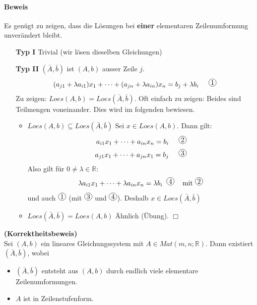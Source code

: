 \documentclass[11pt]{report}
\newcommand*\mycirc[1]{%
  \begin{tikzpicture}
    \node[draw,circle,inner sep=1pt] {#1};
  \end{tikzpicture}}
\newcommand*\Zb[1] {\mathbb{#1}}
\newcommand*\f[1] {\textbf{#1}}
\begin{document}
\paragraph{Beweis}
Es genügt zu zeigen, dass die Lösungen  bei \f{einer} elementaren Zeilenumformung unverändert bleibt.
\begin{itemize}
 \item[\f{Typ I}] Trivial (wir lösen dieselben Gleichungen)
 \item[\f{Typ II}] $(\bar{A}, \bar{b})$ ist $(A, b)$ ausser Zeile $j$.
\begin{align}
 (a_{j1} + \lambda a_{i1}) x_1 + \cdots + (a_{jn}+ \lambda a_{in}) x_n = b_j + \lambda b_i \hspace*{0.5cm} \mycirc{1}
\end{align}
Zu zeigen: $Loes(A, b) = Loes (\bar{A}, \bar{b})$. Oft einfach zu zeigen: Beides sind Teilmengen voneinander. Dies wird im folgenden bewiesen.
\begin{itemize}
\item \f{$Loes(A, b) \subseteq Loes (\bar{A}, \bar{b})$} Sei $x \in Loes(A,b)$. Dann gilt:
\begin{align}
 a_{i1} x_1 + \cdots + a_{in} x_n = b_i \hspace*{0.5cm} \mycirc{2}\\
 a_{j1} x_1 + \cdots + a_{jn} x_1 = b_j \hspace*{0.5cm} \mycirc{3}
\end{align}
Also gilt für $0 \neq \lambda \in \Zb{R}$:
\begin{align}
 \lambda a_{i1} x_1 + \cdots + \lambda a_{in} x_n = \lambda b_i \hspace*{0.2cm} \mycirc{4} \hspace*{0,3cm}\text{ mit } \mycirc{2}
\end{align}
und auch $\mycirc{1}$ (mit $\mycirc{3}$ und $\mycirc{4}$). Deshalb $x \in Loes(\bar{A}, \bar{b})$

\item \f{$Loes(\bar{A}, \bar{b}) = Loes (A, b)$} Ähnlich (Übung). \hfill $\Box$
\end{itemize}
\end{itemize}

\begin{lemma}\f{(Korrektheitsbeweis)}\\
 \label{lemma132}
 Sei $(A, b)$ ein lineares Gleichungssystem mit $A \in Mat(m, n; \Zb{R})$. Dann existiert $(\bar{A}, \bar{b})$, wobei
\begin{itemize}
 \item $(\bar{A}, \bar{b})$ entsteht aus $(A, b)$ durch endlich viele elementare Zeilenumformungen.
 \item $A$ ist in Zeilenstufenform.
\end{itemize}
\end{lemma}
\end{document}
